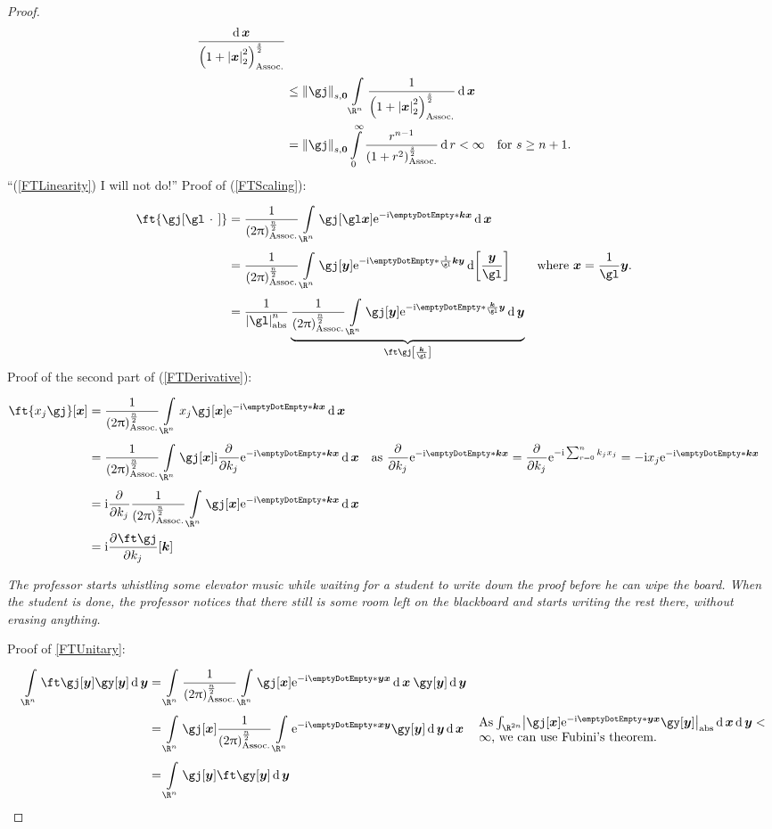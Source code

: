 \documentclass[10pt]{article}
\newcommand{\Rn}{{\R^n}}
\newcommand{\ftnrm}{\frac{1}{\pa{2\Pi}^\frac{n}{2}} }
\newcommand\commentbox[1]{\parbox{7.5cm}{#1}}
\begin{document}
\begin{lemma}
\begin{proof}
\begin{align*}
        \frac{\diffd\vx}{\pa{1+\norm{\vx}^2}^\frac{s}{2}}  \\
        &\leq \SchwartzNorm s\nullmi\gj \int\Rn\frac{1}{\pa{1+\norm{\vx}^2}^\frac{s}{2}}\diffd\vx\\
        &= \SchwartzNorm s\nullmi\gj \int0[\infty]\frac{r^{n-1}}{\pa{1+r^2}^\frac{s}{2}}\diffd r
        < \infty &&\text{for } s\geq n+1\text{.}
      \end{align*}
      ``(\ref{FTLinearity}) I will not do!''
      Proof of (\ref{FTScaling}):
      \begin{align*}
        \ft{\gj\of{\gl\placeholder}} 
        &= \ftnrm\int\Rn\gj\of{\gl\vx}\E^{-\I\scal\vk\vx} \diffd\vx \\
        &= \ftnrm\int\Rn\gj\of\vy\E^{-\I\scal{\frac1\gl\vk}{\vy}} \diffd\of{\frac{\vy}{\gl}}
          && \text{where } \vx=\frac1\gl\vy\text{.} \\
        &= \frac{1}{\abs\gl^n} \underbrace{
          \ftnrm\int\Rn\gj\of\vy\E^{-\I\scal{\frac\vk\gl}\vy}
          \diffd\vy}_{\ft\gj\of{\frac\vk{\gl}}}
      \end{align*}
      Proof of the second part of (\ref{FTDerivative}):
      \begin{align*}
        \ft{x_j\gj}\of\vx 
        &= \ftnrm\int\Rn x_j\gj\of{\vx}\E^{-\I\scal\vk\vx}\diffd\vx \\
        &= \ftnrm
          \int\Rn\gj\of{\vx}\I\pderivop{k_j}\E^{-\I\scal\vk\vx} \diffd\vx 
          && \text{as }\pderivop{k_j}\E^{-\I\scal\vk\vx} =
            \pderivop{k_j}\E^{-\I\sum{r=0}[n] k_j x_j}=-\I x_j \E^{-\I\scal\vk\vx}\\
        &= \I\pderivop{k_j}\ftnrm
          \int\Rn\gj\of\vx\E^{-\I\scal\vk\vx} \diffd\vx \\
        &= \I\pderiv{k_j}{\ft\gj}\of\vk
      \end{align*}
      
      \emph{The professor starts whistling some elevator music while waiting for a student to write down the proof before he can wipe the board. When the student is done, the professor notices that there still is some room left on the blackboard and starts writing the rest there, without erasing anything.}
      
      Proof of \ref{FTUnitary}:
      \begin{align*}
        \int\Rn\ft\gj\of\vy \gy\of\vy \diffd\vy
        &= \int\Rn\ftnrm\int\Rn\gj\of\vx
          \E^{-\I\scal\vy\vx}\diffd\vx\:\gy\of\vy\diffd\vy \\
        &= \int\Rn\gj\of\vx\ftnrm\int\Rn
          \E^{-\I\scal\vx\vy}\gy\of\vy\diffd\vy\diffd\vx
          && \commentbox{As $\int {\R^{2n}}\abs{\gj\of\vx
          \E^{-\I\scal\vy\vx}\gy\of\vy}\diffd\vx\diffd\vy<\infty$,
          we can use Fubini's theorem.} \\
        &=\int\Rn\gj\of\vy \ft\gy\of\vy \diffd\vy
      \end{align*}
      
      
    \end{proof}
  \end{lemma}
  
\end{document}
